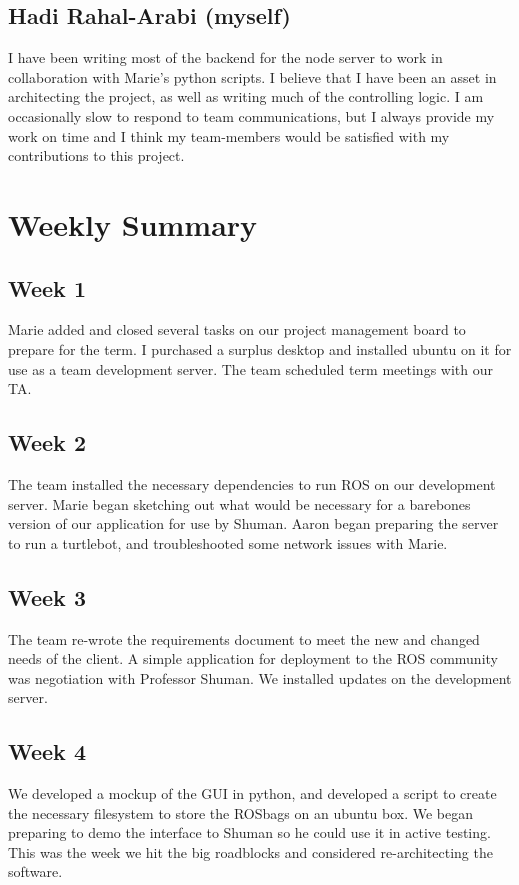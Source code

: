 \documentclass[onecolumn, draftclsnofoot,10pt, compsoc]{IEEEtran}
\begin{document}
\subsection{Hadi Rahal-Arabi (myself)}
I have been writing most of the backend for the node server to work in collaboration with Marie’s python scripts. I believe that I have been an asset in architecting the project, as well as writing much of the controlling logic. I am occasionally slow to respond to team communications, but I always provide my work on time and I think my team-members would be satisfied with my contributions to this project.
\section{Weekly Summary}

\subsection{Week 1}
Marie added and closed several tasks on our project management board to prepare for the term. I purchased a surplus desktop and installed ubuntu on it for use as a team development server. The team scheduled term meetings with our TA.

\subsection{Week 2}
The team installed the necessary dependencies to run ROS on our development server. Marie began sketching out what would be necessary for a barebones version of our application for use by Shuman. Aaron began preparing the server to run a turtlebot, and troubleshooted some network issues with Marie.

\subsection{Week 3}
The team re-wrote the requirements document to meet the new and changed needs of the client. A simple application for deployment to the ROS community was negotiation with Professor Shuman. We installed updates on the development server.

\subsection{Week 4}
We developed a mockup of the GUI in python, and developed a script to create the necessary filesystem to store the ROSbags on an ubuntu box. We began preparing to demo the interface to Shuman so he could use it in active testing. This was the week we hit the big roadblocks and considered re-architecting the software.
\end{document}
